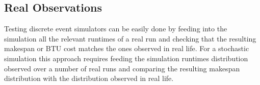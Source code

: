 \documentclass[10pt,conference,compsocconf]{IEEEtran}
\begin{document}

\subsection{Real Observations}

Testing  discrete event  simulators  can  be easily  done  by  feeding into  the
simulation  all the  relevant  runtimes of  a  real run  and  checking that  the
resulting makespan  or BTU cost  matches the ones observed  in real life.  For a
stochastic  simulation this  approach requires  feeding the  simulation runtimes
distribution observed  over a number  of real  runs and comparing  the resulting
makespan distribution with the distribution observed in real life.
\end{document}
